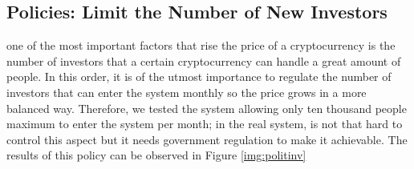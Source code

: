    
   \subsection{Policies: Limit the Number of New Investors}
   one of the most important factors that rise the price of a cryptocurrency is the number of investors that a certain cryptocurrency can handle a great amount of people. In this order, it is of the utmost importance to regulate the number of  investors that can enter the system monthly so the price grows in a more balanced way. Therefore, we tested the system allowing only ten thousand people maximum to enter the system per month; in the real system, is not that hard to control this aspect but it needs government regulation to make it achievable. The results of this policy can be observed in Figure \ref{img:politinv}
   
